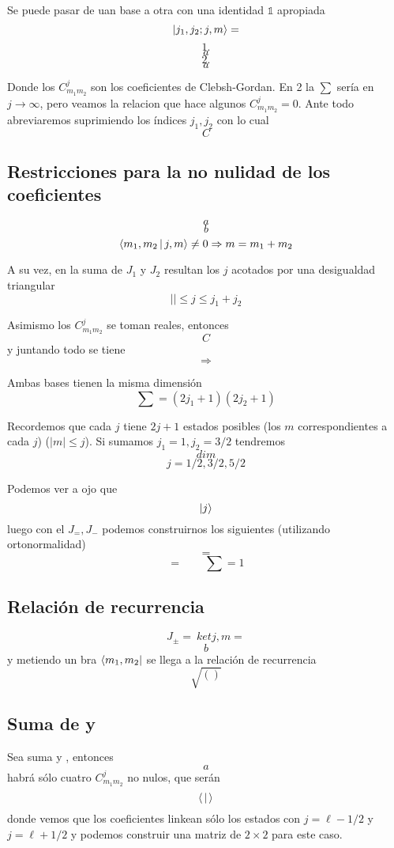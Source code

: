 \documentclass[10pt,oneside]{CBFT_book}
\begin{document}
Se puede pasar de uan base a otra con una identidad $\mathbb{1}$ apropiada
\[
	\Ket{j_1,j_2;j,m} =
\]
\[
	1.
\]
\[
	a
\]
\[
	2.
\]
\[
	a
\]

Donde los $C_{m_1 m_2}^j$ son los coeficientes de Clebsh-Gordan. En 2 la $\sum$ sería en $j\to\infty$, pero 
veamos la 
relacion que hace algunos $C_{m_1 m_2}^j=0$. Ante todo abreviaremos suprimiendo los índices $j_1,j_2$ con lo 
cual 
\[
	C
\]

\subsection{Restricciones para la no nulidad de los coeficientes}

\[
	a
\]
\[
	b
\]
\[
	\Braket{m_1,m_2| j,m} \neq 0 \Rightarrow m = m_1 + m_2
\]

A su vez, en la suma de $J_1$ y $J_2$ resultan los $j$ acotados por una desigualdad triangular 
\[
	|| \leq j \leq j_1 + j_2
\]

Asimismo los $C_{m_1 m_2}^j$ se toman reales, entonces 
\[
	C
\]
y juntando todo se tiene 
\[
	\Rightarrow
\]

Ambas bases tienen la misma dimensión
\[
	\sum = (2j_1 + 1)(2j_2 + 1)
\]

Recordemos que cada $j$ tiene $2j+1$ estados posibles (los $m$ correspondientes a cada $j$) ($|m|\leq j$). Si 
sumamos 
$j_1=1, j_2=3/2$ tendremos 
\[
	dim
\]
\[
	j = 1/2, 3/2, 5/2
\]

Podemos ver a ojo que 
\[
	\Ket{j}
\]
luego con el $J_=, J_-$ podemos construirnos los siguientes (utilizando ortonormalidad)
\[
	= 
\]
\[
	= \qquad \sum = 1
\]

\subsection{Relación de recurrencia}

\[
	J_\pm = \ ket{j,m} = 
\]
\[
	b
\]
y metiendo un bra $\Bra{m_1,m_2}$ se llega a la relación de recurrencia
\[
	\sqrt{()}
\]

\subsection{Suma de  y }

Sea suma  y , entonces 
\[
	a
\]
habrá sólo cuatro $C_{m_1 m_2}^j$ no nulos, que serán 
\[
	\Braket{|}
\]
donde vemos que los coeficientes linkean sólo los estados con $j=\ell-1/2$ y $j=\ell+1/2$ y podemos construir 
una 
matriz de $2\times 2$ para este caso.
\end{document}
